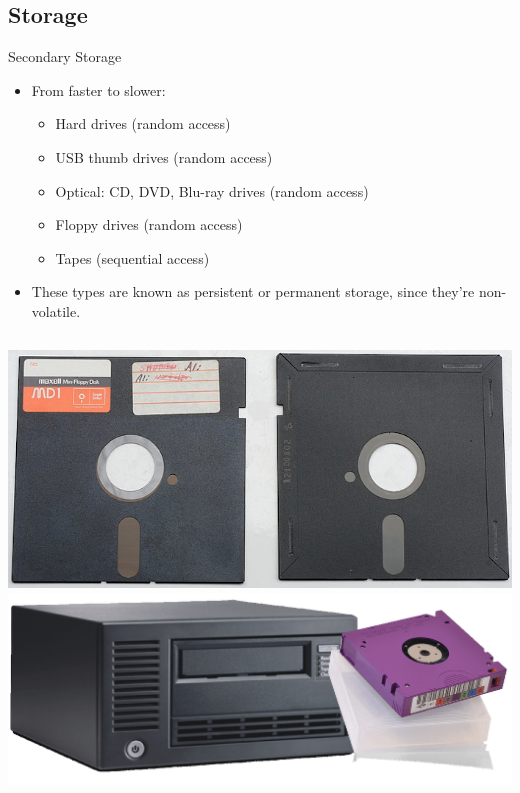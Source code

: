 \documentclass[graphics]{beamer}
\begin{document}
\subsection{Storage}
\begin{frame}{Secondary Storage}
    \begin{itemize}
        \item From faster to slower:
        \begin{itemize}
            \item Hard drives (random access)
            \item USB thumb drives (random access)
            \item Optical: CD, DVD, Blu-ray drives (random access)
            \item Floppy drives (random access)
            \item Tapes (sequential access)
        \end{itemize}
        \item These types are known as persistent or permanent storage, since they're non-volatile.
    \end{itemize}
    \begin{columns}
            \includegraphics[scale=0.20]{L02_ArchNumbersSystems/L2_p17_525.png}
            \includegraphics[scale=0.17]{L02_ArchNumbersSystems/L2_p17_tape.png}
    \end{columns}
\end{frame}
\end{document}
